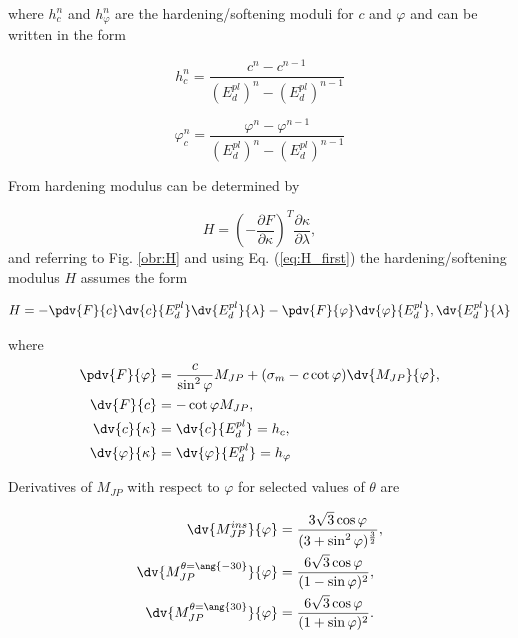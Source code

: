 where $h_c^n$ and $h_\varphi^n$ are the hardening/softening moduli for $c$ and $\varphi$ and can be written in the form


\begin{equation}\label{eq:h_c}
	h_c^n = \dfrac{c^n-c^{n-1}}{(E_d^{pl})^{n}-(E_d^{pl})^{n-1}}
\end{equation}

\begin{equation}\label{eq:h_phi}
 	\varphi_c^n = \dfrac{\varphi^n-\varphi^{n-1}}{(E_d^{pl})^{n}-(E_d^{pl})^{n-1}}
\end{equation}

From \cite{geofem} hardening modulus can be determined by

\begin{equation}\label{eq:H_first}
	H = \left(-\dfrac{\partial F}{\partial \kappa}\right)^T \dfrac{\partial \kappa}{\partial \lambda},
\end{equation}
\newpage
and referring to Fig. \ref{obr:H} and using Eq. (\ref{eq:H_first}) the hardening/softening modulus $H$ assumes the form 

\begin{equation}\label{eq:H}
	H = - \pdv{F}{c} \dv{c}{E_d^{pl}} \dv{E_d^{pl}}{\lambda} - \pdv{F}{\varphi} \dv{\varphi}{E_d^{pl}}, \dv{E_d^{pl}}{\lambda}
\end{equation}

where
\begin{align}
\pdv{F}{\varphi}& = \dfrac{c}{\sin^2\varphi} M_{JP} + (\sigma_m - c\cot \varphi) \dv{M_{JP}}{\varphi},\label{eq:F/phi}\\
\dv{F}{c}& = - \cot \varphi M_{JP},\\
\dv{c}{\kappa}& = \dv{c}{E_d^{pl}} = h_c,\\
\dv{\varphi}{\kappa}& = \dv{\varphi}{E_d^{pl}} = h_\varphi
\end{align}

Derivatives of $M_{JP}$ with respect to $\varphi$ for selected values of $\theta$ are

\begin{align}
	\dv{M_{JP}^{ins}}{\varphi}					& = \dfrac{3\sqrt{3}\cos \varphi}{(3 + \sin^2 \varphi)^{\frac{3}{2}}},\\
	\dv{M_{JP}^{\theta = \ang{-30}}}{\varphi}	& = \dfrac{6\sqrt{3}\cos \varphi}{(1-\sin \varphi)^2},\\
	\dv{M_{JP}^{\theta = \ang{30}}}{\varphi}	& = \dfrac{6\sqrt{3}\cos \varphi}{(1+\sin \varphi)^2}.
\end{align}


